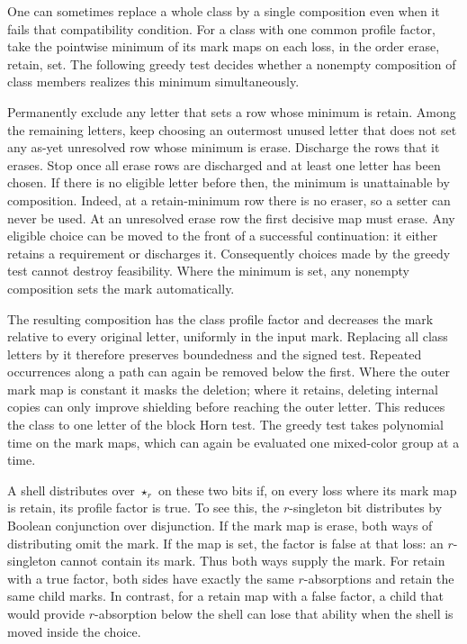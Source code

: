 One can sometimes replace a whole class by a single
composition even when it fails that compatibility
condition. For a class with one common profile factor,
take the pointwise minimum of its mark maps on each
loss, in the order erase, retain, set. The following
greedy test decides whether a nonempty composition of
class members realizes this minimum simultaneously.

Permanently exclude any letter that sets a row whose
minimum is retain. Among the remaining letters, keep
choosing an outermost unused letter that does not set
any as-yet unresolved row whose minimum is erase.
Discharge the rows that it erases. Stop once all erase
rows are discharged and at least one letter has been
chosen. If there is no eligible letter before then,
the minimum is unattainable by composition. Indeed,
at a retain-minimum row there is no eraser, so a
setter can never be used. At an unresolved erase row
the first decisive map must erase. Any eligible choice
can be moved to the front of a successful continuation:
it either retains a requirement or discharges it.
Consequently choices made by the greedy test cannot
destroy feasibility. Where the minimum is set, any
nonempty composition sets the mark automatically.

The resulting composition has the class profile factor
and decreases the mark relative to every original
letter, uniformly in the input mark. Replacing all
class letters by it therefore preserves boundedness
and the signed test. Repeated occurrences along a
path can again be removed below the first. Where the
outer mark map is constant it masks the deletion;
where it retains, deleting internal copies can only
improve shielding before reaching the outer letter.
This reduces the class to one letter of the block
Horn test. The greedy test takes polynomial time
on the mark maps, which can again be evaluated one
mixed-color group at a time.

A shell distributes over $\star_r$ on these two bits
if, on every loss where its mark map is retain, its
profile factor is true. To see this, the $r$-singleton
bit distributes by Boolean conjunction over disjunction.
If the mark map is erase, both ways of distributing
omit the mark. If the map is set, the factor is false
at that loss: an $r$-singleton cannot contain its mark.
Thus both ways supply the mark. For retain with a true
factor, both sides have exactly the same $r$-absorptions
and retain the same child marks. In contrast, for a
retain map with a false factor, a child that would
provide $r$-absorption below the shell can lose that
ability when the shell is moved inside the choice.

